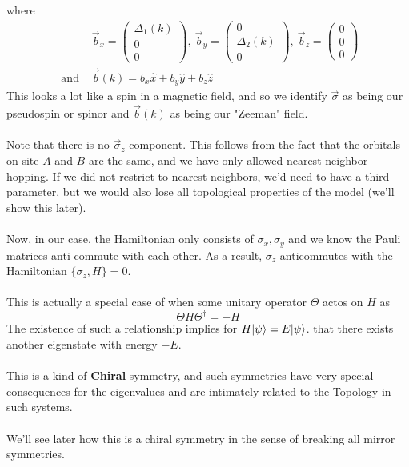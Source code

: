 \documentclass[11pt]{article}
\begin{document}
where \begin{align*}
  &\vec{b}_x = \begin{pmatrix}
    \Delta_1(k) \\ 0 \\ 0
  \end{pmatrix}, ~\vec{b}_y = \begin{pmatrix}
    0 \\ \Delta_2(k) \\ 0
  \end{pmatrix}, ~\vec{b}_z = \begin{pmatrix}
    0\\ 0 \\ 0
  \end{pmatrix} \\
  \text{ and }& \vec{b}(k) = b_x \hat{x} + b_y \hat{y} + b_z \hat{z}
\end{align*} This looks a lot like a spin in a magnetic field, and so we identify $\vec{\sigma}$ as being our pseudospin or spinor and $\vec{b}(k)$ as being our "Zeeman" field.
\\
\\
Note that there is no $\vec{\sigma}_z$ component. This follows from the fact that  the orbitals on site $A$ and $B$ are the same, and we have only allowed nearest neighbor hopping. If we did not restrict to nearest neighbors, we'd need to have a third parameter, but we would also lose all topological properties of the model (we'll show this later).
\\
\\
Now, in our case, the Hamiltonian only consists of $\sigma_x, \sigma_y$ and we know the Pauli matrices anti-commute with each other. As a result, $\sigma_z$ anticommutes with the Hamiltonian $\{\sigma_z, H\} = 0 $.
\\
\\
This is actually a special case of when some unitary operator $\Theta$ actos on $H$ as $$ \Theta H \Theta^{\dagger} = -H $$ The existence of such a relationship implies for $H \lvert\psi\rangle = E\lvert\psi\rangle$. that there exists another eigenstate with energy $-E$.  
\\
\\
This is a kind of \textbf{Chiral} symmetry, and such symmetries have very special consequences for the eigenvalues and are intimately related to the Topology in such systems.
\\
\\
We'll see later how this is a chiral symmetry in the sense of breaking all mirror symmetries.
\end{document}
